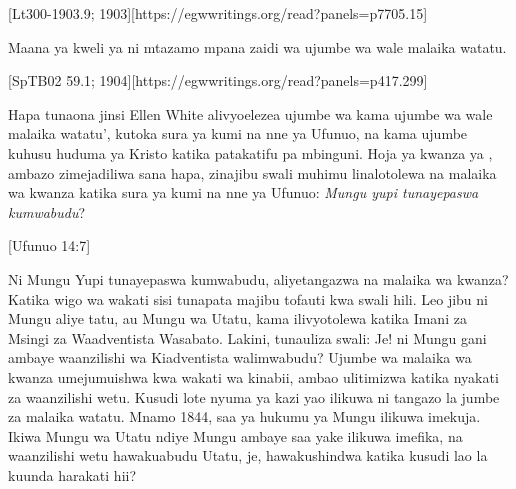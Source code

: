 
 \label{chap:remembering-the-beginning}


[Lt300-1903.9; 1903][https://egwwritings.org/read?panels=p7705.15]


Maana ya kweli ya  ni mtazamo mpana zaidi wa ujumbe wa wale malaika watatu.


[SpTB02 59.1; 1904][https://egwwritings.org/read?panels=p417.299]


Hapa tunaona jinsi Ellen White alivyoelezea ujumbe wa  kama ujumbe wa wale malaika watatu’, kutoka sura ya kumi na nne ya Ufunuo, na kama ujumbe kuhusu huduma ya Kristo katika patakatifu pa mbinguni. Hoja ya kwanza ya , ambazo zimejadiliwa sana hapa, zinajibu swali muhimu linalotolewa na malaika wa kwanza katika sura ya kumi na nne ya Ufunuo: \textit{Mungu yupi tunayepaswa kumwabudu}?


[Ufunuo 14:7]


Ni Mungu Yupi tunayepaswa kumwabudu, aliyetangazwa na malaika wa kwanza? Katika wigo wa wakati sisi tunapata majibu tofauti kwa swali hili. Leo jibu ni Mungu aliye tatu, au Mungu wa Utatu, kama ilivyotolewa katika Imani za Msingi za Waadventista Wasabato. Lakini, tunauliza swali: Je! ni Mungu gani ambaye waanzilishi wa Kiadventista walimwabudu? Ujumbe wa malaika wa kwanza umejumuishwa kwa wakati wa kinabii, ambao ulitimizwa katika nyakati za waanzilishi wetu. Kusudi lote nyuma ya kazi yao ilikuwa ni tangazo la jumbe za malaika watatu. Mnamo 1844, saa ya hukumu ya Mungu ilikuwa imekuja. Ikiwa Mungu wa Utatu ndiye Mungu ambaye saa yake ilikuwa imefika, na waanzilishi wetu hawakuabudu Utatu, je, hawakushindwa katika kusudi lao la kuunda harakati hii?



